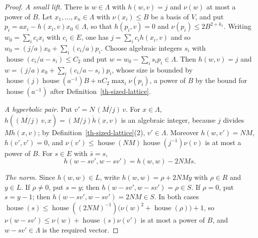 \begin{proof}
\emph{A small lift.} There is $w\in\Lambda$ with $h(w,v)=j$ and $\nu(w)$ at most
a power of $B$. Let $x_1,\ldots,x_n\in\Lambda$ with $\nu(x_i)\leq B$ be a basis of
$V$, and put $p_i=ax_i-h(x_i,v)x_0\in\Lambda$, so that $h(p_i,v)=0$ and
$\nu(p_i)\leq2B^{2+k_1}$. Writing $w_0=\sum_ic_ix_i$ with $c_i\in E$, one has
$j=\sum_ic_ih(x_i,v)$ and so
$w_0=(j/a)x_0+\sum_i(c_i/a)p_i$. Choose algebraic integers $s_i$ with
$\operatorname{house}(c_i/a-s_i)\leq C_2$ and put $w=w_0-\sum_is_ip_i\in\Lambda$.
Then $h(w,v)=j$ and $w=(j/a)x_0+\sum_i(c_i/a-s_i)p_i$, whose size is bounded by
$\operatorname{house}(j)\operatorname{house}(a^{-1})B+nC_2\max_i\nu(p_i)$, a power
of $B$ by the bound for $\operatorname{house}(a^{-1})$ after
Definition~\ref{th-sized-lattice}.

\emph{A hyperbolic pair.} Put $v'=N\,\overline{(M/j)}\,v$. For $x\in\Lambda$,
$h(\overline{(M/j)}\,v,x)=\overline{(M/j)h(x,v)}$ is an algebraic integer,
because $j$ divides $Mh(x,v)$; by Definition~\ref{th-sized-lattice}(2),
$v'\in\Lambda$. Moreover $h(w,v')=NM$, $h(v',v')=0$, and
$\nu(v')\leq\operatorname{house}(NM)\operatorname{house}(j^{-1})\nu(v)$ is at most
a power of $B$. For $s\in E$ with $\bar s=s$,
\[
h(w-sv',w-sv')=h(w,w)-2NMs .
\]

\emph{The norm.} Since $h(w,w)\in L$, write $h(w,w)=\rho+2NMy$ with $\rho\in R$
and $y\in L$. If $\rho\neq0$, put $s=y$; then $h(w-sv',w-sv')=\rho\in S$. If
$\rho=0$, put $s=y-1$; then $h(w-sv',w-sv')=2NM\in S$. In both cases
$\operatorname{house}(s)\leq\operatorname{house}((2NM)^{-1})\bigl(\nu(w)^2+\operatorname{house}(\rho)\bigr)+1$,
so $\nu(w-sv')\leq\nu(w)+\operatorname{house}(s)\nu(v')$ is at most a power of
$B$, and $w-sv'\in\Lambda$ is the required vector.
\end{proof}


